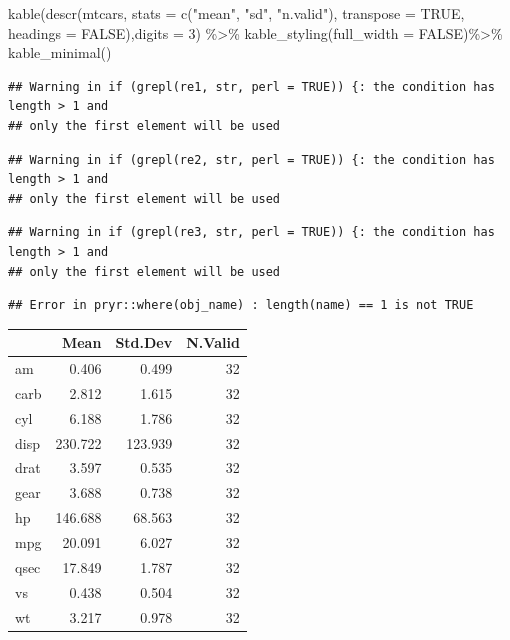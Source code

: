\documentclass[
]{book}
\newenvironment{Shaded}{\begin{snugshade}}{\end{snugshade}}
\newcommand{\AttributeTok}[1]{\textcolor[rgb]{0.77,0.63,0.00}{#1}}
\newcommand{\ConstantTok}[1]{\textcolor[rgb]{0.00,0.00,0.00}{#1}}
\newcommand{\DecValTok}[1]{\textcolor[rgb]{0.00,0.00,0.81}{#1}}
\newcommand{\FunctionTok}[1]{\textcolor[rgb]{0.00,0.00,0.00}{#1}}
\newcommand{\NormalTok}[1]{#1}
\newcommand{\SpecialCharTok}[1]{\textcolor[rgb]{0.00,0.00,0.00}{#1}}
\newcommand{\StringTok}[1]{\textcolor[rgb]{0.31,0.60,0.02}{#1}}
\begin{document}
\begin{Shaded}
\begin{Highlighting}[]
\FunctionTok{kable}\NormalTok{(}\FunctionTok{descr}\NormalTok{(mtcars, }\AttributeTok{stats =} \FunctionTok{c}\NormalTok{(}\StringTok{"mean"}\NormalTok{, }\StringTok{"sd"}\NormalTok{, }\StringTok{"n.valid"}\NormalTok{), }\AttributeTok{transpose =} \ConstantTok{TRUE}\NormalTok{, }\AttributeTok{headings =} \ConstantTok{FALSE}\NormalTok{),}\AttributeTok{digits =} \DecValTok{3}\NormalTok{) }\SpecialCharTok{\%\textgreater{}\%} \FunctionTok{kable\_styling}\NormalTok{(}\AttributeTok{full\_width =} \ConstantTok{FALSE}\NormalTok{)}\SpecialCharTok{\%\textgreater{}\%} \FunctionTok{kable\_minimal}\NormalTok{()}
\end{Highlighting}
\end{Shaded}

\begin{verbatim}
## Warning in if (grepl(re1, str, perl = TRUE)) {: the condition has length > 1 and
## only the first element will be used
\end{verbatim}

\begin{verbatim}
## Warning in if (grepl(re2, str, perl = TRUE)) {: the condition has length > 1 and
## only the first element will be used
\end{verbatim}

\begin{verbatim}
## Warning in if (grepl(re3, str, perl = TRUE)) {: the condition has length > 1 and
## only the first element will be used
\end{verbatim}

\begin{verbatim}
## Error in pryr::where(obj_name) : length(name) == 1 is not TRUE
\end{verbatim}

\begin{table}
\centering
\begin{tabular}{l|r|r|r}
\hline
  & Mean & Std.Dev & N.Valid\\
\hline
am & 0.406 & 0.499 & 32\\
\hline
carb & 2.812 & 1.615 & 32\\
\hline
cyl & 6.188 & 1.786 & 32\\
\hline
disp & 230.722 & 123.939 & 32\\
\hline
drat & 3.597 & 0.535 & 32\\
\hline
gear & 3.688 & 0.738 & 32\\
\hline
hp & 146.688 & 68.563 & 32\\
\hline
mpg & 20.091 & 6.027 & 32\\
\hline
qsec & 17.849 & 1.787 & 32\\
\hline
vs & 0.438 & 0.504 & 32\\
\hline
wt & 3.217 & 0.978 & 32\\
\hline
\end{tabular}
\end{table}
\end{document}
